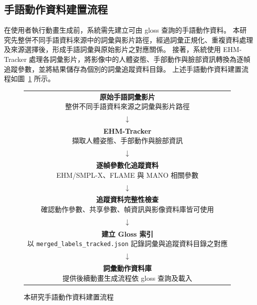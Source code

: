 \documentclass[class=NCU_thesis, crop=false]{standalone}
\begin{document}
\subsection{手語動作資料建置流程}

在使用者執行動畫生成前，系統需先建立可由 gloss 查詢的手語動作資料。
本研究先整併不同手語資料來源中的詞彙與影片路徑，經過詞彙正規化、重複資料處理及來源選擇後，形成手語詞彙與原始影片之對應關係。
接著，系統使用 EHM-Tracker 處理各詞彙影片，將影像中的人體姿態、手部動作與臉部資訊轉換為逐幀追蹤參數，並將結果儲存為個別的詞彙追蹤資料目錄。
上述手語動作資料建置流程如圖~\ref{fig:sign_motion_data_construction} 所示。

\begin{figure}[H]
    \centering
    \renewcommand{\arraystretch}{1.2}
    \begin{tabular}{c}
        \fbox{\parbox{0.72\textwidth}{\centering
        \textbf{原始手語詞彙影片}\\
        整併不同手語資料來源之詞彙與影片路徑}} \\
        $\downarrow$ \\
        \fbox{\parbox{0.72\textwidth}{\centering
        \textbf{EHM-Tracker}\\
        擷取人體姿態、手部動作與臉部資訊}} \\
        $\downarrow$ \\
        \fbox{\parbox{0.72\textwidth}{\centering
        \textbf{逐幀參數化追蹤資料}\\
        EHM/SMPL-X、FLAME 與 MANO 相關參數}} \\
        $\downarrow$ \\
        \fbox{\parbox{0.72\textwidth}{\centering
        \textbf{追蹤資料完整性檢查}\\
        確認動作參數、共享參數、幀資訊與影像資料庫皆可使用}} \\
        $\downarrow$ \\
        \fbox{\parbox{0.72\textwidth}{\centering
        \textbf{建立 Gloss 索引}\\
        以 \texttt{merged\_labels\_tracked.json} 記錄詞彙與追蹤資料目錄之對應}} \\
        $\downarrow$ \\
        \fbox{\parbox{0.72\textwidth}{\centering
        \textbf{詞彙動作資料庫}\\
        提供後續動畫生成流程依 gloss 查詢及載入}} \\
    \end{tabular}
    \caption{本研究手語動作資料建置流程}
    \label{fig:sign_motion_data_construction}
\end{figure}
\end{document}
